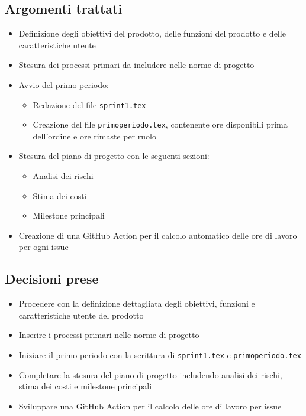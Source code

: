 \documentclass[a4paper, 12pt]{article}
\begin{document}
\subsection{Argomenti trattati}
\begin{itemize}
    \item Definizione degli obiettivi del prodotto, delle funzioni del prodotto e delle caratteristiche utente
    \item Stesura dei processi primari da includere nelle norme di progetto
    \item Avvio del primo periodo:
    \begin{itemize}
        \item Redazione del file \texttt{sprint1.tex}
        \item Creazione del file \texttt{primoperiodo.tex}, contenente ore disponibili prima dell'ordine e ore rimaste per ruolo
    \end{itemize}
    \item Stesura del piano di progetto con le seguenti sezioni:
    \begin{itemize}
        \item Analisi dei rischi
        \item Stima dei costi
        \item Milestone principali
    \end{itemize}
    \item Creazione di una GitHub Action per il calcolo automatico delle ore di lavoro per ogni issue
\end{itemize}

\subsection{Decisioni prese}
\begin{itemize}
    \item Procedere con la definizione dettagliata degli obiettivi, funzioni e caratteristiche utente del prodotto
    \item Inserire i processi primari nelle norme di progetto
    \item Iniziare il primo periodo con la scrittura di \texttt{sprint1.tex} e \texttt{primoperiodo.tex}
    \item Completare la stesura del piano di progetto includendo analisi dei rischi, stima dei costi e milestone principali
    \item Sviluppare una GitHub Action per il calcolo delle ore di lavoro per issue
\end{itemize}
\end{document}
